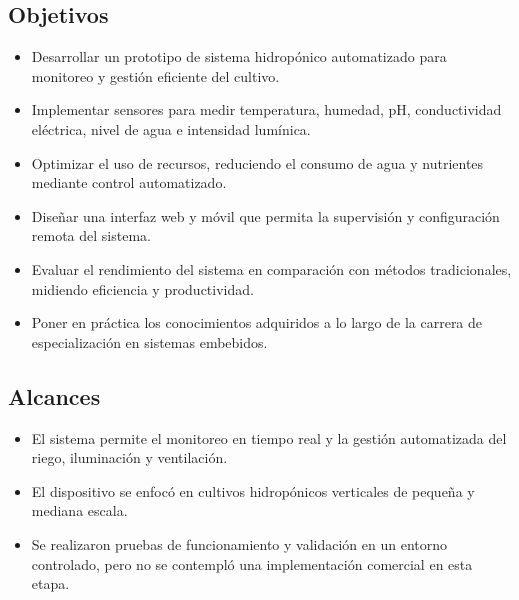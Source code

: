 \subsection{Objetivos}
\begin{itemize}
    \item Desarrollar un prototipo de sistema hidropónico automatizado para monitoreo y gestión eficiente del cultivo.
    \item Implementar sensores para medir temperatura, humedad, pH, conductividad eléctrica, nivel de agua e intensidad lumínica.
    \item Optimizar el uso de recursos, reduciendo el consumo de agua y nutrientes mediante control automatizado.
    \item Diseñar una interfaz web y móvil que permita la supervisión y configuración remota del sistema.
    \item Evaluar el rendimiento del sistema en comparación con métodos tradicionales, midiendo eficiencia y productividad.
    \item Poner en práctica los conocimientos adquiridos a lo largo de la carrera de especialización en sistemas embebidos.
\end{itemize}

\subsection{Alcances}

\begin{itemize}
    \item El sistema permite el monitoreo en tiempo real y la gestión automatizada del riego, iluminación y ventilación.
    \item El dispositivo se enfocó en cultivos hidropónicos verticales de pequeña y mediana escala.
    \item Se realizaron pruebas de funcionamiento y validación en un entorno controlado, pero no se contempló una implementación comercial en esta etapa.
\end{itemize}



